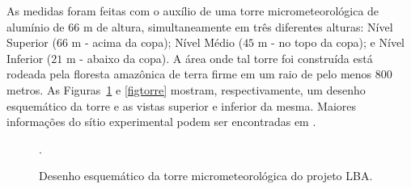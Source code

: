 As medidas foram feitas com o auxílio de uma torre micrometeorológica de alumínio de $66$ m de altura, simultaneamente em três diferentes alturas: Nível Superior ($66$ m - acima da copa); Nível Médio ($45$ m - no topo da copa); e Nível Inferior ($21$ m - abaixo da copa). 
A área onde tal torre foi construída está rodeada pela floresta amazônica de terra firme em um raio de pelo menos $800$ metros. As Figuras~\ref{torre} e \ref{figtorre} mostram, respectivamente, um desenho esquemático da torre e as vistas superior e inferior da mesma. Maiores informações do sítio experimental podem ser encontradas em .

\begin{figure}[ht]
	\caption{Desenho esquemático da torre micrometeorológica do projeto LBA.}
	\vspace{6mm}	%
	\begin{center}
	\end{center}
	\vspace{2mm}	%
	\legenda{}	%
	\label{torre}
	.
\end{figure}


